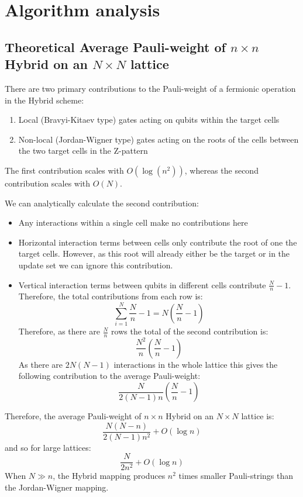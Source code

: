 \documentclass[pdftex,pra,aps,twocolumn,twoside]{revtex4-2}
\theoremstyle{plain}
\theoremstyle{note}
\newcommand\+{{\footnotesize \raisebox{0.3ex}{+}}}
\begin{document}
\section{Algorithm analysis}
\label{section:algorithmanalysis}
\subsection{Theoretical Average Pauli-weight of $n\times n$ Hybrid on an $N\times N$ lattice}
\label{section:hybridanalysis}
There are two primary contributions to the Pauli-weight of a fermionic operation in the Hybrid scheme:
\begin{enumerate}
    \item Local (Bravyi-Kitaev type) gates acting on qubits within the target cells
    \item Non-local (Jordan-Wigner type) gates acting on the roots of the cells between the two target cells in the Z-pattern
\end{enumerate}
The first contribution scales with $O(\log(n^2))$, whereas the second contribution scales with $O(N)$.

We can analytically calculate the second contribution:
\begin{itemize}
    \item Any interactions within a single cell make no contributions here
    \item Horizontal interaction terms between cells only contribute the root of one the target cells. However, as this root will already either be the target or in the update set we can ignore this contribution.
    \item Vertical interaction terms between qubits in different cells contribute $\frac{N}{n} -1$. Therefore, the total contributions from each row is:
    \begin{equation}
            \sum_{i=1}^{N} \frac{N}{n} -1 = N\left(\frac{N}{n} -1\right)
    \end{equation}
    Therefore, as there are $\frac{N}{n}$ rows the total of the second contribution is:
    \begin{equation}
        \frac{N^2}{n}\left(\frac{N}{n}-1\right)
    \end{equation}
    As there are $2N(N - 1)$ interactions in the whole lattice this gives the following contribution to the average Pauli-weight:
    \begin{equation}
        \frac{N}{2(N-1)n}\left(\frac{N}{n}-1\right)
    \end{equation}
\end{itemize}
Therefore, the average Pauli-weight of $n\times n$ Hybrid on an $N\times N$ lattice is:
\begin{equation}
        \frac{N(N-n)}{2(N-1)n^2} + O(\log n) 
\end{equation}
and so for large lattices:
\begin{equation}
        \frac{N}{2n^2} + O(\log n) 
\end{equation}
When $N\gg n$, the Hybrid mapping produces $n^2$ times smaller Pauli-strings than the Jordan-Wigner mapping.
\end{document}
